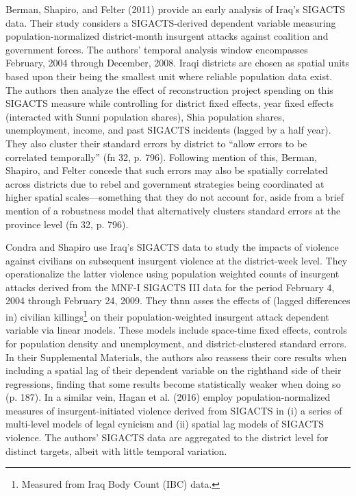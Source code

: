 \documentclass[12pt]{article}
\begin{document}
Berman, Shapiro, and Felter (2011) provide an early analysis of Iraq's SIGACTS data. Their study considers a SIGACTS-derived dependent variable measuring population-normalized district-month insurgent attacks against coalition and government forces. The authors' temporal analysis window encompasses February, 2004 through December, 2008. Iraqi districts are chosen as spatial units based upon their being the smallest unit where reliable population data exist. The authors then analyze the effect of reconstruction project spending on this SIGACTS measure while controlling for district fixed effects, year fixed effects (interacted with Sunni population shares), Shia population shares, unemployment, income, and past SIGACTS incidents (lagged by a half year). They also cluster their standard errors by district to ``allow errors to be correlated temporally'' (fn 32, p. 796). Following mention of this, Berman, Shapiro, and Felter concede that such errors may also be spatially correlated across districts due to rebel and government strategies being coordinated at higher spatial scales---something that they do not account for, aside from a brief mention of a robustness model that alternatively clusters standard errors at the province level (fn 32, p. 796).

Condra and Shapiro use Iraq's SIGACTS data to study the impacts of violence against civilians on subsequent insurgent violence at the district-week level. They operationalize the latter violence using population weighted counts of insurgent attacks derived from the MNF-I SIGACTS III data for the period February 4, 2004 through February 24, 2009. They thnn asses the effects of (lagged differences in) civilian killings\footnote{Measured from Iraq Body Count (IBC) data.} on their population-weighted insurgent attack dependent variable via linear models. These models include space-time fixed effects, controls for population density and unemployment, and district-clustered standard errors. In their Supplemental Materials, the authors also reassess their core results when including a spatial lag of their dependent variable on the righthand side of their regressions, finding that some results become statistically weaker when doing so (p. 187). In a similar vein, Hagan et al. (2016) employ population-normalized measures of insurgent-initiated violence derived from SIGACTS in (i) a series of multi-level models of legal cynicism and (ii) spatial lag models of SIGACTS violence. The authors' SIGACTS data are aggregated to the district level for distinct targets, albeit with little temporal variation.
\end{document}

